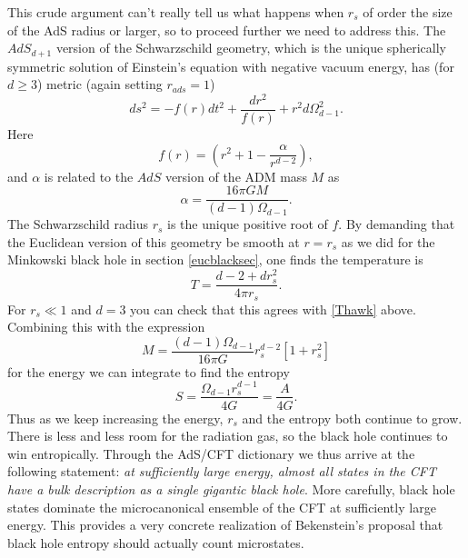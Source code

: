 \documentclass[12pt]{article}
\newcommand{\be}{\begin{equation}}
\newcommand{\ee}{\end{equation}}
\begin{document}
This crude argument can't really tell us what happens when $r_s$ of order the size of the AdS radius or larger, so to proceed further we need to address this.  The $AdS_{d+1}$ version of the Schwarzschild geometry, which is the unique spherically symmetric solution of Einstein's equation with negative vacuum energy, has (for $d\geq 3$) metric (again setting $r_{ads}=1$)
\be\label{adsschg}
ds^2=-f(r)dt^2+\frac{dr^2}{f(r)}+r^2 d\Omega_{d-1}^2.
\ee
Here
\be\label{fdef}
f(r)=\left(r^2+1-\frac{\alpha}{r^{d-2}}\right),
\ee
and $\alpha$ is related to the $AdS$ version of the ADM mass $M$ as
\be
\alpha=\frac{16\pi G M}{(d-1)\Omega_{d-1}}.
\ee
The Schwarzschild radius $r_s$ is the unique positive root of $f$.  By demanding that the Euclidean version of this geometry be smooth at $r=r_s$ as we did for the Minkowski black hole in section \ref{eucblacksec}, one finds the temperature is
\be\label{adsT}
T=\frac{d-2+dr_s^2}{4\pi r_s}.
\ee
For $r_s\ll 1$ and $d=3$ you can check that this agrees with \eqref{Thawk} above. 
Combining this with the expression
\be\label{adsM}
M=\frac{(d-1)\Omega_{d-1}}{16\pi G} r_s^{d-2}\left[1+r_s^2\right]
\ee
for the energy we can integrate to find the entropy
\be\label{adsS}
S=\frac{\Omega_{d-1} r_s^{d-1}}{4 G}=\frac{A}{4G}.
\ee
Thus as we keep increasing the energy, $r_s$ and the entropy both continue to grow.  There is less and less room for the radiation gas, so the black hole continues to win entropically.  Through the AdS/CFT dictionary we thus arrive at the following statement: \textit{at sufficiently large energy, almost all states in the CFT have a bulk description as a single gigantic black hole}.  More carefully, black hole states dominate the microcanonical ensemble of the CFT at sufficiently large energy.  This provides a very concrete realization of Bekenstein's proposal that black hole entropy should actually count microstates.
\end{document}
